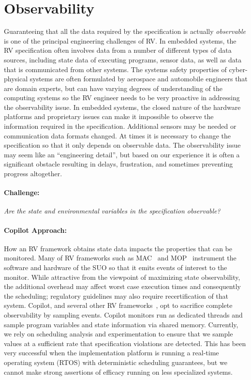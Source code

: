 \section{Observability}\label{sec:observ} 
Guaranteeing that all the data required by the specification is
actually \emph{observable} is one of the principal engineering
challenges of RV. In embedded systems, the RV specification often
involves data from a number of different types of data sources,
including state data of executing programs, sensor data, as well as
data that is communicated from other systems.  The systems safety
properties of cyber-physical systems are often formulated by aerospace
and automobile engineers that are domain experts, but can have
varying degrees of understanding of the computing systems so the RV
engineer needs to be very proactive in addressing the observability
issue. In embedded systems, the closed nature of the hardware
platforms and proprietary  issues can make it impossible to observe the
information required in the specification.  Additional sensors may be
needed or communication data formats changed.  At times it is
necessary to change the specification so that it only depends on
observable data.  The observability issue may seem like an
``engineering detail'', but based on our experience it is often a
significant obstacle resulting in  delays, frustration, and sometimes
preventing progress altogether.


\paragraph{Challenge:} \emph{Are the state and environmental variables in the
specification  observable?}  


  \paragraph{Copilot Approach:} How an RV framework obtains state data impacts the properties that
  can be monitored. Many of RV frameworks such as MAC~\cite{KimLKS04}
  and MOP~\cite{ChenR05} instrument the software and hardware of the
  SUO so that it emits events of interest to the monitor.  While
  attractive from the viewpoint of maximizing state observability, the
  additional overhead may affect  worst case
  execution times and consequently the scheduling; 
  regulatory guidelines may  also require recertification of that system.
  Copilot, and several other RV frameworks~\cite{sampling,Kane15,borzoo}, opt to sacrifice complete
  observability by sampling events.  Copilot monitors run as dedicated
  threads and sample program variables and state information via shared
  memory.  Currently, we rely on scheduling analysis and experimentation to ensure that we sample values at a
  sufficient rate that specification violations are detected. This has
  been very successful when the implementation platform is running a
  real-time operating system (RTOS) with deterministic scheduling
  guarantees, but we cannot make strong assertions of efficacy running on less
  specialized systems.

